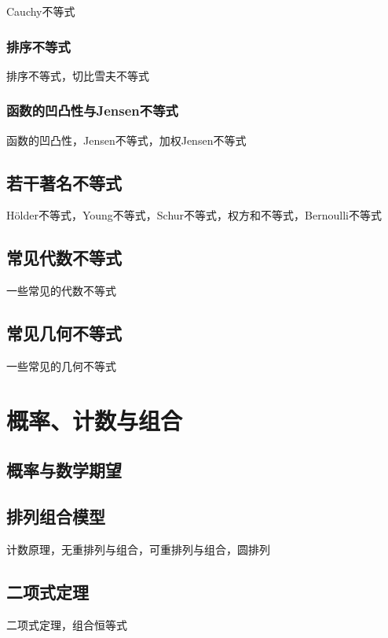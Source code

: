 \documentclass[lang=cn, zihao=4.5]{elegantbook}
\begin{document}
Cauchy不等式

\subsection{排序不等式}

排序不等式，切比雪夫不等式

\subsection{函数的凹凸性与Jensen不等式}

函数的凹凸性，Jensen不等式，加权Jensen不等式

\section{若干著名不等式}

Hölder不等式，Young不等式，Schur不等式，权方和不等式，Bernoulli不等式

\section{常见代数不等式}

一些常见的代数不等式

\section{常见几何不等式}

一些常见的几何不等式

\chapter{概率、计数与组合}

\section{概率与数学期望}

\section{排列组合模型}

计数原理，无重排列与组合，可重排列与组合，圆排列

\section{二项式定理}

二项式定理，组合恒等式
\end{document}
